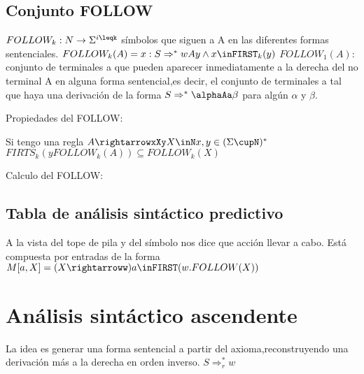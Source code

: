\subsection{Conjunto FOLLOW}
$FOLLOW_{k}:N\rightarrow\Sigma^{i\leqk}$ símbolos que siguen  a A en las diferentes formas sentenciales.
$FOLLOW_{k}(A)={x:S\Rightarrow^{*}wAy \wedge x\inFIRST_{k}(y)}$
$FOLLOW_{1}(A):$ conjunto de terminales a que pueden aparecer inmediatamente a la derecha del no terminal A en alguna forma sentencial,es decir, el conjunto de terminales a tal que haya una derivación de la forma $S\Rightarrow^{*}\alphaAa\beta$ para algún $\alpha$ y  $\beta$.

Propiedades del FOLLOW:

Si tengo una regla $A\rightarrowxXy  X\inN  x,y\in(\Sigma\cupN)^{*}$
$FIRTS_{k}(y FOLLOW_{k}(A))\subseteq FOLLOW_{k}(X)$

Calculo del FOLLOW:

\subsection{Tabla de análisis sintáctico predictivo}

A la vista del tope de pila y del símbolo nos dice que acción llevar a cabo.
Está compuesta por entradas de la forma $M[a,X]=(X\rightarroww) a\inFIRST(w.FOLLOW(X))$
 



\section{Análisis sintáctico ascendente}

La idea es generar una forma sentencial a partir del axioma,reconstruyendo una derivación más a la derecha en orden inverso. $S\Rightarrow_{r}^{*}w$



















